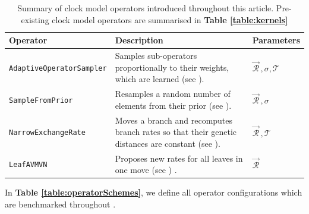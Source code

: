 \documentclass[10pt,letterpaper]{article}
\begin{document}
\begin{table}[h!]
\centering
\begin{tabular}{l p{4cm} l} 
 Operator & Description & Parameters  \\
  \hline
 \texttt{AdaptiveOperatorSampler} & Samples sub-operators proportionally to their weights, which are learned (see \nameref{sect:adaptiveSampling}). & $\vec{\mathcal{R}}^{\,}, \sigma, \mathcal{T}$ \\
  \hline
 \texttt{SampleFromPrior} & Resamples a random number of elements from their prior (see \nameref{sect:adaptiveSampling}). & $\vec{\mathcal{R}}^{\,}, \sigma$ \\
  \hline
 \texttt{NarrowExchangeRate} & Moves a branch and recomputes branch rates so that their genetic distances are constant (see \nameref{sect:NER}). & $\vec{\mathcal{R}}^{\,}, \mathcal{T}$\\
  \hline
 \texttt{LeafAVMVN}  & Proposes new rates for all leaves in one move (see \nameref{AVMVN_sect}) \cite{baele2017adaptive}. & $\vec{\mathcal{R}}^{\,}$ \\
\end{tabular}
\caption{Summary of clock model operators introduced throughout this article. Pre-existing clock model operators are summarised in \textbf{Table \ref{table:kernels}}}
\label{table:newOperators}
\end{table}


In \textbf{Table \ref{table:operatorSchemes}}, we define all operator configurations which are benchmarked throughout \textbf{}.
\end{document}
